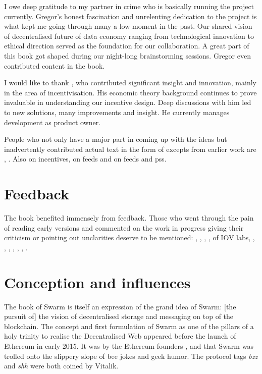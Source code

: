 I owe deep gratitude to my partner in crime  who is basically running the project currently. Gregor's honest fascination and unrelenting dedication to the project is what kept me going through many a low moment in the past. Our shared vision of decentralised future of data economy ranging from technological innovation to ethical direction served as the foundation for our collaboration. A great part of this book got shaped during our night-long brainstorming sessions. Gregor even contributed content in the book.

I would like to thank , who contributed significant insight and innovation, mainly in the area of incentivisation. His economic theory background continues to prove invaluable in understanding our incentive design. Deep discussions with him led to new solutions, many improvements and insight. He currently manages development as product owner.

People who not only have a major part in coming up with the ideas but inadvertently contributed actual text in the form of excepts from earlier work are , . Also  on incentives,  
 on feeds and  on feeds and pss. 

\section*{Feedback}

The book benefited immensely from feedback. Those who went through the pain of reading early versions and commented on the work in progress giving their criticism or pointing out unclarities deserve to be mentioned: , , , ,  of IOV labs, 
, , 
, ,  , , .



\section*{Conception and influences}

The book of Swarm is itself an expression of the grand idea of Swarm: [the pursuit of] the vision of decentralised storage and messaging on top of the blockchain. The concept and first formulation of Swarm as one of the pillars of a holy trinity to realise the Decentralised Web appeared before the launch of Ethereum in early 2015. It was by the Ethereum founders ,  and  that Swarm was trolled onto the slippery slope of bee jokes and geek humor. The protocol tags \emph{bzz} and \emph{shh} were both coined by Vitalik. 


